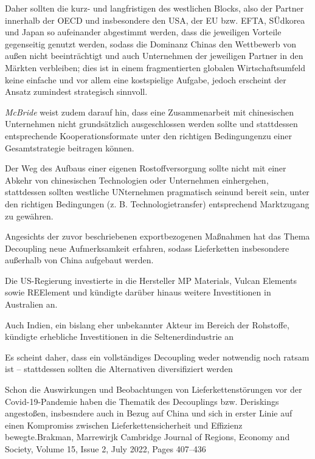 \documentclass[12pt,a4paper,oneside]{book} %
\begin{document}
Daher sollten die kurz- und langfristigen des westlichen Blocks, also der Partner innerhalb der OECD und insbesondere den USA, der EU bzw. EFTA, SÜdkorea und Japan so aufeinander abgestimmt werden, dass die jeweiligen Vorteile gegenseitig genutzt werden, sodass die Dominanz Chinas den Wettbewerb von außen nicht beeinträchtigt und auch Unternehmen der jeweiligen Partner in den Märkten verbleiben; dies ist in einem fragmentierten globalen Wirtschaftsumfeld keine einfache und vor allem eine kostspielige Aufgabe, jedoch erscheint der Ansatz zumindest strategisch sinnvoll.\autocite{Mcbride: Battery Geopolitics: Balancing Industrial Power in the Race to Store Energy, S. 2}

\textit{McBride} weist zudem darauf hin, dass eine Zusammenarbeit mit chinesischen Unternehmen nicht grundsätzlich ausgeschlossen werden sollte und stattdessen entsprechende Kooperationsformate \glqq unter den richtigen Bedingungen\grqq zu einer Gesamtstrategie beitragen können.\autocite{Mcbride: Battery Geopolitics: Balancing Industrial Power in the Race to Store Energy, S. 2}

Der Weg des Aufbaus einer eigenen Rostoffversorgung sollte nicht mit einer Abkehr von chinesischen Technologien oder Unternehmen einhergehen, stattdessen sollten westliche UNternehmen \glqq pragmatisch sein\grqq und bereit sein, unter den richtigen Bedingungen (z. B. Technologietransfer) entsprechend Marktzugang zu gewähren.\autocite{McBridge, S. 26}

Angesichts der zuvor beschriebenen exportbezogenen Maßnahmen hat das Thema Decoupling neue Aufmerksamkeit erfahren, sodass Lieferketten insbesondere außerhalb von China aufgebaut werden. 

Die US-Regierung investierte in die Hersteller MP Materials, Vulcan Elements sowie REElement und kündigte darüber hinaus weitere Investitionen in Australien an.

Auch Indien, ein bislang eher unbekannter Akteur im Bereich der Rohstoffe, kündigte  erhebliche Investitionen in die Seltenerdindustrie an

Es scheint daher, dass ein vollständiges Decoupling weder notwendig noch ratsam ist -- stattdessen sollten die Alternativen diversifiziert werden

Schon die Auswirkungen und Beobachtungen von Lieferkettenstörungen vor der Covid-19-Pandemie haben die Thematik des Decouplings bzw. Deriskings angestoßen, insbesndere auch in Bezug auf China und sich in erster Linie auf einen Kompromiss zwischen Lieferkettensicherheit und Effizienz bewegte.\autocites{Baldwin und Evenett, 2020}{Brakman, Marrewirjk Cambridge Journal of Regions, Economy and Society, Volume 15, Issue 2, July 2022, Pages 407–436}
\end{document}

